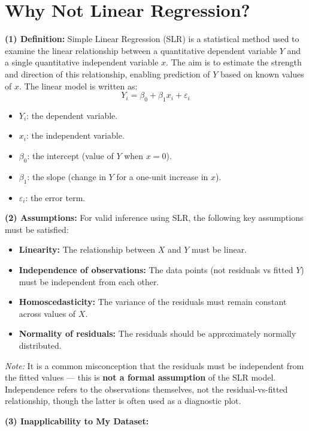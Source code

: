 \documentclass{article}
\begin{document}
\section*{ Why Not Linear Regression?}

\textbf{(1) Definition:} Simple Linear Regression (SLR) is a statistical method used to examine the linear relationship between a quantitative dependent variable \( Y \) and a single quantitative independent variable \( x \). The aim is to estimate the strength and direction of this relationship, enabling prediction of \( Y \) based on known values of \( x \). The linear model is written as:
\[
Y_i = \beta_0 + \beta_1 x_i + \varepsilon_i
\]
\begin{itemize}
  \item \( Y_i \): the dependent variable.
  \item \( x_i \): the independent variable.
  \item \( \beta_0 \): the intercept (value of \( Y \) when \( x = 0 \)).
  \item \( \beta_1 \): the slope (change in \( Y \) for a one-unit increase in \( x \)).
  \item \( \varepsilon_i \): the error term.
\end{itemize}

\textbf{(2) Assumptions:} For valid inference using SLR, the following key assumptions must be satisfied:

\begin{itemize}
  \item \textbf{Linearity:} The relationship between \( X \) and \( Y \) must be linear.
  \item \textbf{Independence of observations:} The data points (not residuals vs fitted \( Y \)) must be independent from each other.
  \item \textbf{Homoscedasticity:} The variance of the residuals must remain constant across values of \( X \).
  \item \textbf{Normality of residuals:} The residuals should be approximately normally distributed.
\end{itemize}

\textit{Note:} It is a common misconception that the residuals must be independent from the fitted values --- this is \textbf{not a formal assumption} of the SLR model. Independence refers to the observations themselves, not the residual-vs-fitted relationship, though the latter is often used as a diagnostic plot.

\textbf{(3) Inapplicability to My Dataset:}
\end{document}

